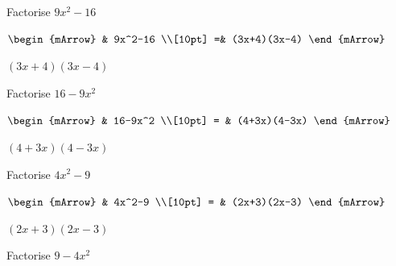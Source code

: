 \begin{mtask}
   \task \begin{exercise} Factorise $9x^2-16$\\
             \begin{envSolution}
			      
			      $\begin{mArrow}
			         & 9x^2-16                       \\[10pt]    
					=& (3x+4)(3x-4) 
				 \end{mArrow}$
                 \begin{shortsolution}  
				       $(3x+4)(3x-4)$
			     \end{shortsolution}				 
               \end{envSolution}
         \end{exercise}


   \task \begin{exercise} Factorise $16-9x^2$\\
             \begin{envSolution}
			      
			      $\begin{mArrow}
			         & 16-9x^2                        \\[10pt] 
                      = &  (4+3x)(4-3x)					 
				 \end{mArrow}$
                 \begin{shortsolution}  
				       $(4+3x)(4-3x)$
			     \end{shortsolution}				 
               \end{envSolution}
         \end{exercise}
   \task \begin{exercise} Factorise $4x^2-9$\\
             \begin{envSolution}
			      
			      $\begin{mArrow}
			            &  4x^2-9                   \\[10pt]   
                      = &  (2x+3)(2x-3)					  
				 \end{mArrow}$
                 \begin{shortsolution}  
				       $(2x+3)(2x-3)$
			     \end{shortsolution}				 
               \end{envSolution}
         \end{exercise}


   \task \begin{exercise} Factorise $9-4x^2$\\
             \begin{envSolution}
			      

\end{envSolution}
\end{exercise}
\end{mtask}
